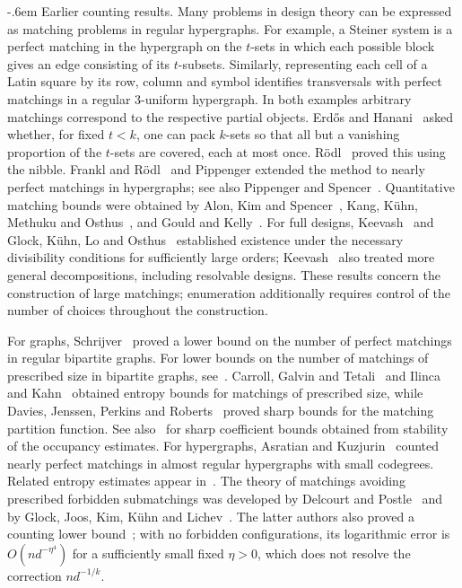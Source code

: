 \documentclass[11pt,reqno]{amsart}
\makeatletter
\numberwithin{equation}{section}
\renewcommand{\paragraph}{\@startsection{paragraph}{4}%
    \z@{.75\linespacing\@plus.2\linespacing\@minus.1\linespacing}%
    {-.6em}%
    {\normalfont\bfseries}}
\theoremstyle{plain}
\theoremstyle{definition}
\makeatother
\begin{document}
\paragraph{Earlier counting results.}
Many problems in design theory can be expressed as matching problems in regular hypergraphs.
For example, a Steiner system is a perfect matching in the hypergraph on the $t$-sets in which each possible block gives an edge consisting of its $t$-subsets.
Similarly, representing each cell of a Latin square by its row, column and symbol identifies transversals with perfect matchings in a regular $3$-uniform hypergraph.
In both examples arbitrary matchings correspond to the respective partial objects.
Erd\H{o}s and Hanani~\cite{EH} asked whether, for fixed $t<k$, one can pack $k$-sets so that all but a vanishing proportion of the $t$-sets are covered, each at most once.
R\"odl~\cite{Rodl} proved this using the nibble. Frankl and R\"odl~\cite{FR} and Pippenger extended the method to nearly perfect matchings in hypergraphs; see also Pippenger and Spencer~\cite{PS}.
Quantitative matching bounds were obtained by Alon, Kim and Spencer~\cite{AKS}, Kang, K\"uhn, Methuku and Osthus~\cite{KKMO}, and Gould and Kelly~\cite{GK}.
For full designs, Keevash~\cite{Keevash} and Glock, K\"uhn, Lo and Osthus~\cite{GKLO} established existence under the necessary divisibility conditions for sufficiently large orders; Keevash~\cite{KeevashII} also treated more general decompositions, including resolvable designs.
These results concern the construction of large matchings; enumeration additionally requires control of the number of choices throughout the construction.

For graphs, Schrijver~\cite{Schrijver} proved a lower bound on the number of perfect matchings in regular bipartite graphs.
For lower bounds on the number of matchings of prescribed size in bipartite graphs, see~\cite{Csikvari,Lelarge}.
Carroll, Galvin and Tetali~\cite{CGT} and Ilinca and Kahn~\cite{IK} obtained entropy bounds for matchings of prescribed size, while Davies, Jenssen, Perkins and Roberts~\cite{DJPR} proved sharp bounds for the matching partition function.
See also~\cite{DJPRStability} for sharp coefficient bounds obtained from stability of the occupancy estimates.
For hypergraphs, Asratian and Kuzjurin~\cite{AsratianKuzjurin} counted nearly perfect matchings in almost regular hypergraphs with small codegrees.
Related entropy estimates appear in~\cite{Luria,DDK,KSW}.
The theory of matchings avoiding prescribed forbidden submatchings was developed by Delcourt and Postle~\cite{DP} and by Glock, Joos, Kim, K\"uhn and Lichev~\cite{GJKKL}.
The latter authors also proved a counting lower bound~\cite[Theorem~3.5]{GJKKL}; with no forbidden configurations, its logarithmic error is $O(nd^{-\eta^4})$ for a sufficiently small fixed $\eta>0$, which does not resolve the correction $nd^{-1/k}$.
\end{document}
